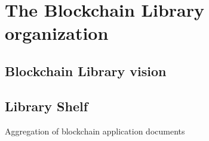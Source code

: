 \documentclass[twoside,twocolumn]{article}
\begin{document}
\cite{kurzweil2000age}

\section{The Blockchain Library organization}

\subsection{Blockchain Library vision}

\subsection{Library Shelf}
Aggregation of blockchain application documents
\end{document}
